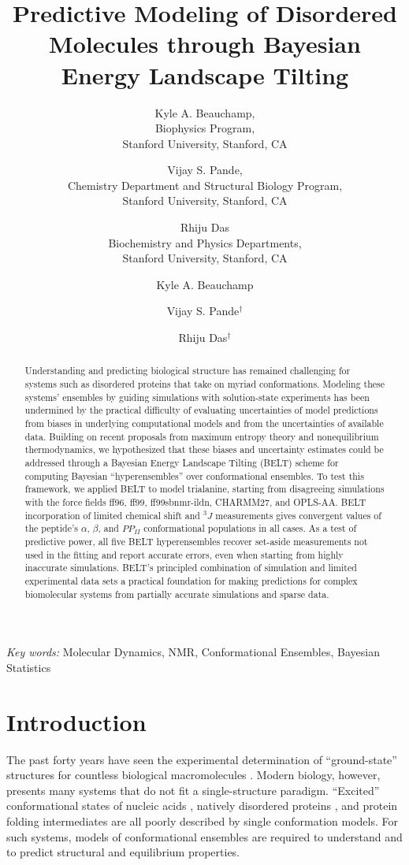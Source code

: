 \documentclass[journal=jacsat,manuscript=article]{achemso}
\author{Kyle A. Beauchamp, \\
Biophysics Program, \\
Stanford University, Stanford, CA
\and Vijay S. Pande, \\
Chemistry Department and Structural Biology Program, \\
Stanford University, Stanford, CA
\and Rhiju Das \\
Biochemistry and Physics Departments, \\
Stanford University, Stanford, CA
}
\author{Kyle A. Beauchamp}
\affiliation[Biophysics Program]{Biophysics Program}
\author{Vijay S. Pande$^\dagger$}
\affiliation[Chemistry Department]{Chemistry Department, Stanford University, Stanford, CA}
\author{Rhiju Das$^\dagger$}
\affiliation[Biochemistry Department]{Biochemistry Department, Stanford University, Stanford, CA}
\title{Predictive Modeling of Disordered Molecules through Bayesian Energy Landscape Tilting}
\begin{document}
\maketitle

\begin{abstract}

Understanding and predicting biological structure has remained challenging for systems such as disordered proteins that take on myriad conformations. Modeling these systems' ensembles by guiding simulations with solution-state experiments has been undermined by the practical difficulty of evaluating uncertainties of model predictions from biases in underlying computational models and from the uncertainties of available data. Building on recent proposals from maximum entropy theory and nonequilibrium thermodynamics, we hypothesized that these biases and uncertainty estimates could be addressed through a Bayesian Energy Landscape Tilting (BELT) scheme for computing Bayesian \enquote{hyperensembles} over conformational ensembles.  To test this framework, we applied BELT to model trialanine, starting from disagreeing simulations with the force fields ff96, ff99, ff99sbnmr-ildn, CHARMM27, and OPLS-AA. BELT incorporation of limited chemical shift and $^3J$ measurements gives convergent values of the peptide's $\alpha$, $\beta$, and $PP_{II}$ conformational populations in all cases. As a test of predictive power, all five BELT hyperensembles recover set-aside measurements not used in the fitting and report accurate errors, even when starting from highly inaccurate simulations. BELT's principled combination of simulation and limited experimental data sets a practical foundation for making predictions for complex biomolecular systems from partially accurate simulations and sparse data.   

\end{abstract}

\emph{Key words:} Molecular Dynamics, NMR, Conformational Ensembles,  Bayesian Statistics

\section*{Introduction}

The past forty years have seen the experimental determination of ``ground-state'' structures for countless biological macromolecules \cite{Berman2000}. Modern biology, however, presents many systems that do not fit a single-structure paradigm.  ``Excited'' conformational states of nucleic acids \cite{dethoff2012}, natively disordered proteins \cite{fink2005}, and protein folding intermediates \cite{korzhnev2004} are all poorly described by single conformation models.  For such systems, models of conformational ensembles are required to understand and to predict structural and equilibrium properties.  
\end{document}
